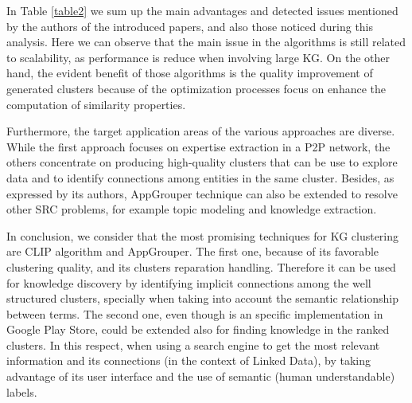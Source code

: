 \documentclass[runningheads]{llncs}
\begin{document}
\medskip In Table \ref{table2} we sum up the main advantages and detected issues mentioned by the authors of the introduced papers, and also those noticed during this analysis. Here we can observe that the main issue in the algorithms is still related to scalability, as performance is reduce when involving large KG. On the other hand, the evident benefit of those algorithms is the quality improvement of generated clusters because of the optimization processes focus on enhance the computation of similarity properties.

Furthermore, the target application areas of the various approaches are diverse. While the first approach focuses on expertise extraction in a P2P network, the others concentrate on producing high-quality clusters that can be use to explore data and to identify connections among entities in the same cluster. Besides, as expressed by its authors, AppGrouper technique can also be extended to resolve other SRC problems, for example topic modeling and knowledge extraction.

In conclusion, we consider that the most promising techniques for KG clustering are CLIP algorithm and AppGrouper. The first one, because of its favorable clustering quality, and its clusters reparation handling. Therefore it can be used for knowledge discovery by identifying implicit connections among the well structured clusters, specially when taking into account the semantic relationship between terms. The second one, even though is an specific implementation in Google Play Store, could be extended also for finding knowledge in the ranked clusters. In this respect, when using a search engine to get the most relevant information and its connections (in the context of Linked Data), by taking advantage of its user interface and the use of semantic (human understandable) labels.
\end{document}
